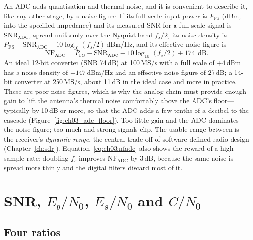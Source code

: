An ADC adds quantisation and thermal noise, and it is convenient to describe it, like any other stage, by
a noise figure. If its full-scale input power is $P_{\text{FS}}$ (dBm, into the specified impedance) and
its measured SNR for a full-scale signal is $\mathrm{SNR}_{\text{ADC}}$, spread uniformly over the Nyquist
band $f_s/2$, its noise density is $P_{\text{FS}}-\mathrm{SNR}_{\text{ADC}}-10\log_{10}(f_s/2)$\,dBm/Hz, and
its effective noise figure is
\begin{equation}
\mathrm{NF}_{\text{ADC}}=P_{\text{FS}}-\mathrm{SNR}_{\text{ADC}}-10\log_{10}(f_s/2)+174\ \ \mathrm{dB}.
\label{eq:ch03:nfadc}
\end{equation}
An ideal 12-bit converter (SNR 74\,dB) at 100\,MS/s with a full scale of $+4$\,dBm has a noise density of
$-147$\,dBm/Hz and an effective noise figure of 27\,dB; a 14-bit converter at 250\,MS/s, about 11\,dB in the
ideal case and more in practice. These are poor noise figures, which is why the analog chain must provide
enough gain to lift the antenna's thermal noise comfortably above the ADC's floor---typically by 10\,dB or
more, so that the ADC adds a few tenths of a decibel to the cascade (Figure~\ref{fig:ch03_adc_floor}). Too
little gain and the ADC dominates the noise figure; too much and strong signals clip. The usable range
between is the receiver's \emph{dynamic range}, the central trade-off of software-defined radio design
(Chapter~\ref{ch:sdr}). Equation~\eqref{eq:ch03:nfadc} also shows the reward of a high sample rate:
doubling $f_s$ improves $\mathrm{NF}_{\text{ADC}}$ by 3\,dB, because the same noise is spread more thinly
and the digital filters discard most of it.

\section{SNR, \texorpdfstring{$E_b/N_0$}{Eb/N0}, \texorpdfstring{$E_s/N_0$}{Es/N0} and \texorpdfstring{$C/N_0$}{C/N0}}
\label{sec:ch03:snr}

\subsection{Four ratios}

